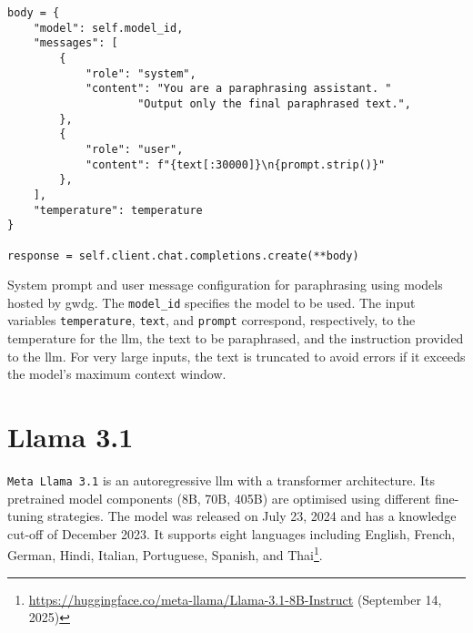 \begin{listing}[H]
\centering
\begin{verbatim}
body = {
    "model": self.model_id,
    "messages": [
        {
            "role": "system",
            "content": "You are a paraphrasing assistant. "
                    "Output only the final paraphrased text.",
        },
        {
            "role": "user",
            "content": f"{text[:30000]}\n{prompt.strip()}"
        },
    ],
    "temperature": temperature
}

response = self.client.chat.completions.create(**body)
\end{verbatim}
\caption{
System prompt and user message configuration for paraphrasing using models hosted by \ac{gwdg}. 
The \texttt{model\_id} specifies the model to be used. 
The input variables \texttt{temperature}, \texttt{text}, and \texttt{prompt} correspond, respectively, to the temperature for the \ac{llm}, the text to be paraphrased, and the instruction provided to the \ac{llm}.
For very large inputs, the text is truncated to avoid errors if it exceeds the model’s maximum context window.
}
\label{lst:paraphrase_prompt}
\end{listing}



\section{Llama 3.1}

\texttt{Meta Llama 3.1} is an autoregressive \ac{llm} with a transformer architecture.
Its pretrained model components  (8B, 70B, 405B) are optimised using different fine-tuning strategies.
The model was released on July 23, 2024 and has a knowledge cut-off of December 2023.
It supports eight languages including English, French, German, Hindi, Italian, Portuguese, Spanish, and Thai\footnote{\url{https://huggingface.co/meta-llama/Llama-3.1-8B-Instruct} (September 14, 2025)}.



